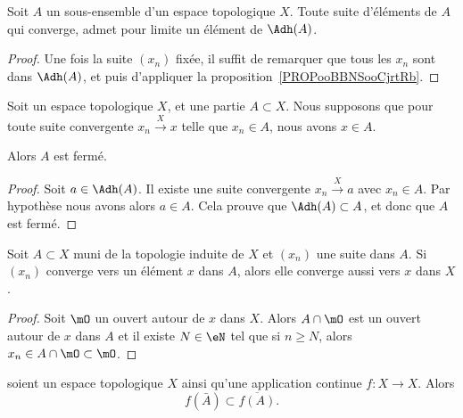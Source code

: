\begin{corollary}\label{CorLimAbarA}
	Soit \( A \) un sous-ensemble d'un espace topologique \( X\). Toute suite d'éléments de \( A\) qui converge, admet pour limite un élément de \( \Adh(A) \).
\end{corollary}
\begin{proof}
	Une fois la suite \( (x_n) \) fixée, il suffit de remarquer que tous les \( x_n \) sont dans \( \Adh(A) \), et puis d'appliquer la proposition~\ref{PROPooBBNSooCjrtRb}.
\end{proof}

\begin{proposition}	\label{PROPooEXUMooAFbpVJ}
	Soit un espace topologique \( X\), et une partie \( A\subset X\). Nous supposons que pour toute suite convergente \( x_n\stackrel{ X}{\longrightarrow} x\) telle que \( x_n\in A\), nous avons \( x\in A\).

	Alors \( A\) est fermé.
\end{proposition}

\begin{proof}
	Soit \( a\in\Adh(A)\). Il existe une suite convergente \( x_n\stackrel{ X}{\longrightarrow} a\) avec \( x_n\in A\). Par hypothèse nous avons alors \( a\in A\). Cela prouve que \( \Adh(A)\subset A\), et donc que \( A\) est fermé.
\end{proof}


\begin{lemma}   \label{LemPESaiVw}
	Soit \( A\subset X\) muni de la topologie induite de \( X\) et \( (x_n)\) une suite dans \( A\). Si \( (x_n) \) converge vers un élément \( x \) dans \(A \), alors elle converge aussi vers \(x \) dans \( X \).
\end{lemma}

\begin{proof}
	Soit \( \mO\) un ouvert autour de \( x\) dans \( X\). Alors \( A\cap\mO\) est un ouvert autour de \( x\) dans \( A\) et il existe \( N\in \eN\) tel que si \( n\geq N\), alors \( x_n\in A\cap\mO\subset\mO\).
\end{proof}

\begin{lemma}      \label{LEMooAIVCooXTzWZi}
	soient un espace topologique \( X\) ainsi qu'une application continue \(f \colon X\to X  \). Alors
	\begin{equation}
		f(\bar A)\subset\overline{f(A)}.
	\end{equation}
\end{lemma}

